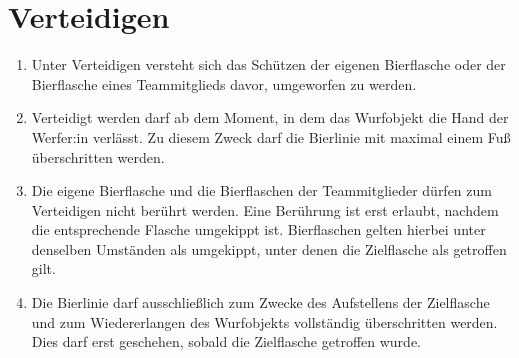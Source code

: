 \section{Verteidigen}
\begin{enumerate}[label={(\arabic*)}]
    \item
    Unter Verteidigen versteht sich das Schützen der eigenen Bierflasche oder der Bierflasche eines Teammitglieds davor, umgeworfen zu werden.

    \item
    Verteidigt werden darf ab dem Moment, in dem das Wurfobjekt die Hand der Werfer:in verlässt.
    Zu diesem Zweck darf die Bierlinie mit maximal einem Fuß überschritten werden.

    \item
    Die eigene Bierflasche und die Bierflaschen der Teammitglieder dürfen zum Verteidigen nicht berührt werden.
    Eine Berührung ist erst erlaubt, nachdem die entsprechende Flasche umgekippt ist.
    Bierflaschen gelten hierbei unter denselben Umständen als umgekippt, unter denen die Zielflasche als getroffen gilt.

    \item
    Die Bierlinie darf ausschließlich zum Zwecke des Aufstellens der Zielflasche und zum Wiedererlangen des Wurfobjekts vollständig überschritten werden.
    Dies darf erst geschehen, sobald die Zielflasche getroffen wurde.
\end{enumerate}

